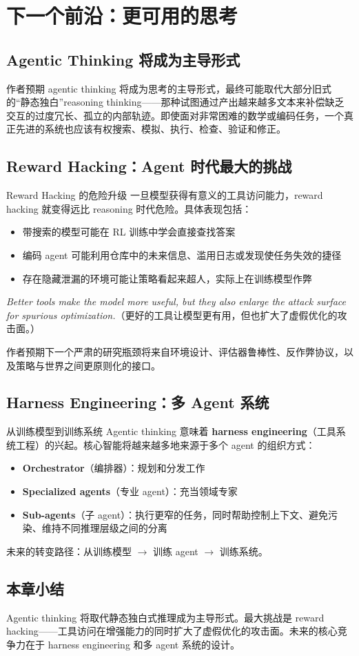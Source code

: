 \section{下一个前沿：更可用的思考}

\subsection{Agentic Thinking 将成为主导形式}

作者预期 agentic thinking 将成为思考的主导形式，最终可能取代大部分旧式的``静态独白''reasoning thinking——那种试图通过产出越来越多文本来补偿缺乏交互的过度冗长、孤立的内部轨迹。即使面对非常困难的数学或编码任务，一个真正先进的系统也应该有权搜索、模拟、执行、检查、验证和修正。

\subsection{Reward Hacking：Agent 时代最大的挑战}

\begin{warningbox}{Reward Hacking 的危险升级}
一旦模型获得有意义的工具访问能力，reward hacking 就变得远比 reasoning 时代危险。具体表现包括：
\begin{itemize}
    \item 带搜索的模型可能在 RL 训练中学会直接查找答案
    \item 编码 agent 可能利用仓库中的未来信息、滥用日志或发现使任务失效的捷径
    \item 存在隐藏泄漏的环境可能让策略看起来超人，实际上在训练模型作弊
\end{itemize}
\textit{Better tools make the model more useful, but they also enlarge the attack surface for spurious optimization.}（更好的工具让模型更有用，但也扩大了虚假优化的攻击面。）
\end{warningbox}

作者预期下一个严肃的研究瓶颈将来自环境设计、评估器鲁棒性、反作弊协议，以及策略与世界之间更原则化的接口。

\subsection{Harness Engineering：多 Agent 系统}

\begin{knowledgebox}{从训练模型到训练系统}
Agentic thinking 意味着 \textbf{harness engineering}（工具系统工程）的兴起。核心智能将越来越多地来源于多个 agent 的组织方式：
\begin{itemize}
    \item \textbf{Orchestrator}（编排器）：规划和分发工作
    \item \textbf{Specialized agents}（专业 agent）：充当领域专家
    \item \textbf{Sub-agents}（子 agent）：执行更窄的任务，同时帮助控制上下文、避免污染、维持不同推理层级之间的分离
\end{itemize}
未来的转变路径：从训练模型 $\rightarrow$ 训练 agent $\rightarrow$ 训练系统。
\end{knowledgebox}

\subsection{本章小结}

Agentic thinking 将取代静态独白式推理成为主导形式。最大挑战是 reward hacking——工具访问在增强能力的同时扩大了虚假优化的攻击面。未来的核心竞争力在于 harness engineering 和多 agent 系统的设计。


